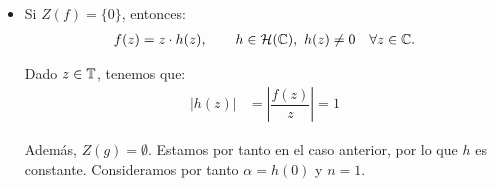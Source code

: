 \begin{ejercicio}
\begin{itemize}
        \item Si $Z(f)=\{0\}$, entonces:
        \begin{align*}
            f(z) = z\cdot h(z),\qquad h\in \mathcal{H}(\mathbb{C}),\ h(z)\neq 0 \quad \forall z\in \mathbb{C}.
        \end{align*}

        Dado $z\in \mathbb{T}$, tenemos que:
        \begin{align*}
            \left|h(z)\right| &= \left| \dfrac{f(z)}{z} \right| = 1
        \end{align*}

        Además, $Z(g)=\emptyset$. Estamos por tanto en el caso anterior, por lo que $h$ es constante. Consideramos por tanto $\alpha=h(0)$ y $n=1$.
    \end{itemize}
\end{ejercicio}